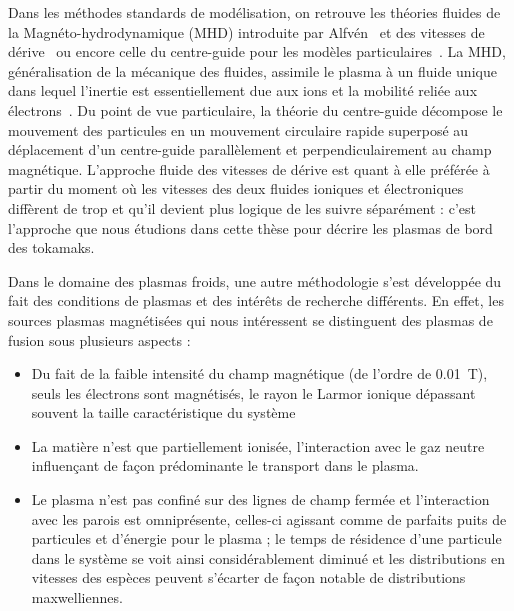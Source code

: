\begin{refsection}
Dans les méthodes standards de modélisation, on retrouve les théories fluides de
la Magnéto-hydrodynamique
 (MHD) introduite
par Alfvén~\parencite{Alfven} et des vitesses de dérive~\parencite{SarazinPhD}
ou encore celle du centre-guide pour les modèles
particulaires~\parencite{Taylor,Lee,Garbet10}.
La MHD, généralisation de la mécanique des fluides, assimile le plasma à un fluide unique dans lequel
l'inertie est essentiellement due aux ions et la mobilité reliée aux
électrons~\parencite{Rax}. Du point de vue particulaire, la
théorie du centre-guide décompose le mouvement des particules en un mouvement
circulaire rapide superposé au déplacement d'un centre-guide parallèlement et
perpendiculairement au champ magnétique. L'approche fluide des vitesses de
dérive est quant à elle préférée à partir du moment où les vitesses des deux fluides
ioniques et électroniques diffèrent de trop et qu'il devient plus logique de les
suivre séparément : c'est l'approche que nous étudions dans cette thèse pour
décrire les plasmas de bord des tokamaks.

Dans le domaine des plasmas froids, une autre méthodologie s'est développée du
fait des conditions de plasmas et des intérêts de recherche
différents. En effet, les sources plasmas magnétisées qui nous intéressent
se distinguent des plasmas de fusion sous plusieurs aspects :

\begin{itemize}
  \item Du fait de la faible intensité du champ magnétique (de l'ordre de
  0.01~T), seuls les électrons sont magnétisés, le rayon le Larmor ionique dépassant souvent la
  taille caractéristique du système
  \item La matière n'est que partiellement ionisée, l'interaction avec
  le gaz neutre influençant de façon prédominante le transport dans le plasma.
  \item Le plasma n'est pas confiné sur des lignes de champ fermée et
  l'interaction avec les parois est omniprésente, celles-ci agissant comme de
  parfaits puits de particules et d'énergie pour le plasma ;
  le temps de résidence d'une particule dans le système se voit
  ainsi considérablement diminué et les distributions en vitesses des
  espèces peuvent s'écarter de façon notable de distributions maxwelliennes.
\end{itemize}


\end{refsection}
